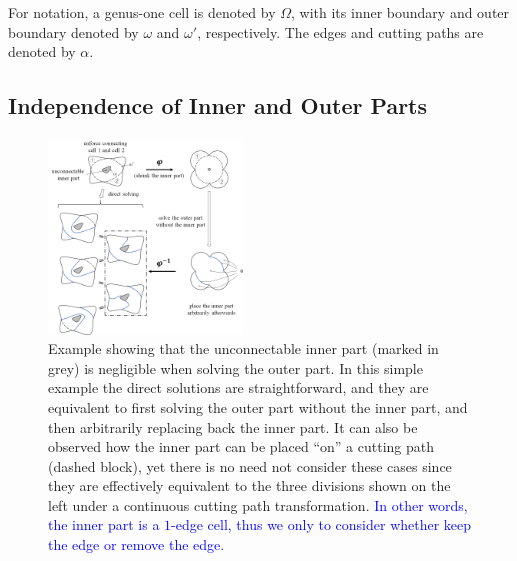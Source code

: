 \documentclass[Afour,sageh,times]{sagej}
\begin{document}
For notation, a genus-one cell is denoted by $\Omega$, with its inner boundary and outer boundary denoted by $\omega$ and $\omega'$, 
respectively. The edges and cutting paths are denoted by $\alpha$. 

\subsection{Independence of Inner and Outer Parts}
\label{subsection_un_inner_cell}
\begin{figure}[t]
\centering
\includegraphics[width = 0.46\textwidth]{figures/RSS_related_figures/proof/fig_physical_hole_6}
\caption{Example showing that the unconnectable inner part (marked in grey) is negligible when solving the outer part. 
In this simple example the direct solutions are straightforward, and they are equivalent to first solving the outer part without the inner part, 
and then arbitrarily replacing back the inner part. It can also be observed how the inner part can be placed ``on'' a cutting path 
(dashed block), yet there is no need not consider these cases since they are effectively equivalent to the three divisions shown on the left under a continuous cutting path transformation. 
\textcolor{blue}{In other words, the inner part is a $1$-edge cell, thus we only to consider whether keep the edge or remove the edge.}  
}
 \label{fig_physical_hole}
\end{figure}
\end{document}
